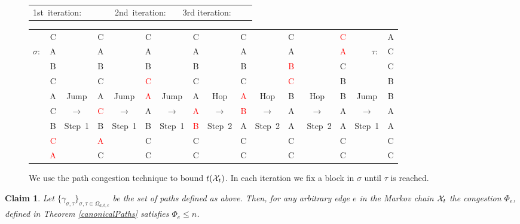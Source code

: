 \documentclass[10 pt]{article}
\newcommand{\EX}{{\cal X}}
\newtheorem{claim}[thm]{Claim}
\begin{document}
\begin{figure}[h]
\noindent
\begin{tiny}


\begin{tabular}{ccccccccr}
\mbox{1st iteration:} &\quad&\quad&\quad\quad\quad\quad\quad\quad\quad\quad\quad\quad\quad\quad\quad\quad\quad\quad\quad&\mbox{2nd iteration:}&\quad&3rd iteration:\\
\end{tabular}

\hspace*{-0.3cm}
\begin{tabular}{rcccccccccccccc}
C&&C&& C&&C&&C&&C&&\textcolor{red}{C}&&A\\
$\sigma:\quad$A& &A&& A&&A&&A&&{A}&&\textcolor{red}{A}&$\quad\quad\tau:$&C\\
B&&B& &B&&B&&B&&\textcolor{red}{B}&&{C}&&C\\
C&&C&&\textcolor{red}{ C}&&C&&C&&\textcolor{red}{C}&&B&&B\\
A&\mbox{\tiny Jump}&A&\mbox{\tiny Jump}&\textcolor{red}{ A}&\mbox{\tiny Jump}&A&\mbox{\tiny Hop}&\textcolor{red}{A}&\mbox{\tiny Hop}&B&\mbox{\tiny Hop}&B&\mbox{\tiny Jump}&B\\
{C}&$\longrightarrow$&\textcolor{red}{C}&$\longrightarrow$& A&$\longrightarrow$&\textcolor{red}{A}&$\longrightarrow$&\textcolor{red}{B}&$\longrightarrow$&A&$\longrightarrow$&A&$\longrightarrow$&A\\
B&\mbox{\tiny Step 1}&B&\mbox{\tiny Step 1}& B&\mbox{\tiny Step 1}&\textcolor{red}{B}&\mbox{\tiny Step 2}&A&\mbox{\tiny Step 2}&A&\mbox{ \tiny Step 2}&A&\mbox{\tiny Step 1}&A\\
\textcolor{red}{C}&& \textcolor{red}{A}&&C&&C&&C&&C&&C&&C\\
\textcolor{red}{A}&& C&&C &&C&&C&&C&&C&&C 

\end{tabular}
\caption{We use the path congestion technique to bound $t(\EX_t)$. In each iteration we fix a block in $\sigma$ until $\tau$ is reached.}
\end{tiny}
\end{figure}







\begin{claim}\label{PathClaim}
 Let $\{\gamma_{\sigma,\tau}\}_{\sigma,\tau\in\Omega_{a,b,c}}$ be the set of paths defined as above. Then, for any arbitrary edge $e$ in
the Markov chain $\EX_t$ the congestion $\Phi_e$, defined in Theorem \ref{canonicalPaths} satisfies $\Phi_e\leq n$.

\end{claim}
\end{document}
